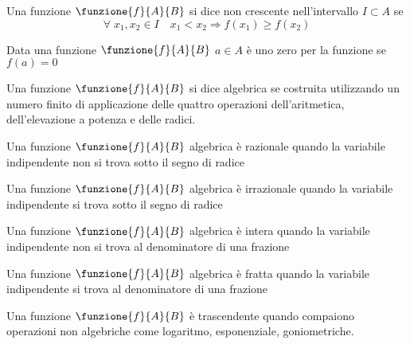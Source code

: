 \begin{defn}\label{defn:funzione-non-crescente}
	Una funzione $\funzione{f}{A}{B}$ si dice non crescente nell'intervallo  $I\subset A$ se
	\begin{equation*}
	\forall\; x_1,x_2\in I\quad x_1< x_2\Longrightarrow f(x_1)\geq f(x_2)
	\end{equation*}
\end{defn}
\begin{defn}\label{defn:zero-di-una-funzione}
	Data una funzione $\funzione{f}{A}{B}$ $a\in A$ è uno zero per la funzione se $f(a)=0$
\end{defn}
\begin{defn}\label{defn:funzione-algebrica}
	Una funzione $\funzione{f}{A}{B}$ si dice algebrica se costruita utilizzando un numero finito di applicazione delle quattro operazioni dell'aritmetica, dell'elevazione a potenza e delle radici. 
\end{defn}
\begin{defn}\label{defn:funzione-algebrica-razionale}
Una funzione $\funzione{f}{A}{B}$ algebrica è razionale quando la variabile indipendente non si trova sotto il segno di radice
\end{defn}
\begin{defn}\label{defn:funzione-algebrica-irrazionale}
	Una funzione $\funzione{f}{A}{B}$ algebrica è irrazionale quando la variabile indipendente  si trova sotto il segno di radice 
\end{defn}
\begin{defn}\label{defn:funzione-algebrica-intera}
	Una funzione $\funzione{f}{A}{B}$ algebrica è intera quando la variabile indipendente non si trova al denominatore di una frazione
\end{defn}
\begin{defn}\label{defn:funzione-algebrica-fratta}
Una funzione $\funzione{f}{A}{B}$ algebrica è fratta quando la variabile indipendente si trova al denominatore di una frazione
\end{defn}
\begin{defn}\label{defn:funzione-trascendente}
		Una funzione $\funzione{f}{A}{B}$  è trascendente quando compaiono operazioni non algebriche come logaritmo, esponenziale, goniometriche.
\end{defn}
